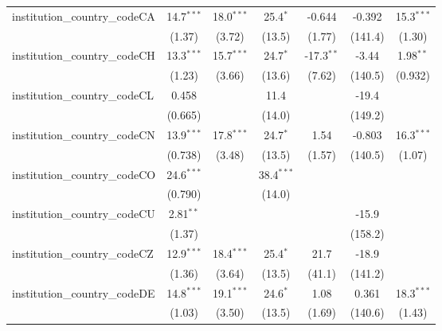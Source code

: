 \begin{tabular}{lcccccc}
   institution\_country\_codeCA          & 14.7$^{***}$  & 18.0$^{***}$ & 25.4$^{*}$   & -0.644        & -0.392        & 15.3$^{***}$\\   
                                         & (1.37)        & (3.72)       & (13.5)       & (1.77)        & (141.4)       & (1.30)\\   
   institution\_country\_codeCH          & 13.3$^{***}$  & 15.7$^{***}$ & 24.7$^{*}$   & -17.3$^{**}$  & -3.44         & 1.98$^{**}$\\   
                                         & (1.23)        & (3.66)       & (13.6)       & (7.62)        & (140.5)       & (0.932)\\   
   institution\_country\_codeCL          & 0.458         &              & 11.4         &               & -19.4         &   \\   
                                         & (0.665)       &              & (14.0)       &               & (149.2)       &   \\   
   institution\_country\_codeCN          & 13.9$^{***}$  & 17.8$^{***}$ & 24.7$^{*}$   & 1.54          & -0.803        & 16.3$^{***}$\\   
                                         & (0.738)       & (3.48)       & (13.5)       & (1.57)        & (140.5)       & (1.07)\\   
   institution\_country\_codeCO          & 24.6$^{***}$  &              & 38.4$^{***}$ &               &               &   \\   
                                         & (0.790)       &              & (14.0)       &               &               &   \\   
   institution\_country\_codeCU          & 2.81$^{**}$   &              &              &               & -15.9         &   \\   
                                         & (1.37)        &              &              &               & (158.2)       &   \\   
   institution\_country\_codeCZ          & 12.9$^{***}$  & 18.4$^{***}$ & 25.4$^{*}$   & 21.7          & -18.9         &   \\   
                                         & (1.36)        & (3.64)       & (13.5)       & (41.1)        & (141.2)       &   \\   
   institution\_country\_codeDE          & 14.8$^{***}$  & 19.1$^{***}$ & 24.6$^{*}$   & 1.08          & 0.361         & 18.3$^{***}$\\   
                                         & (1.03)        & (3.50)       & (13.5)       & (1.69)        & (140.6)       & (1.43)\\   

\end{tabular}
